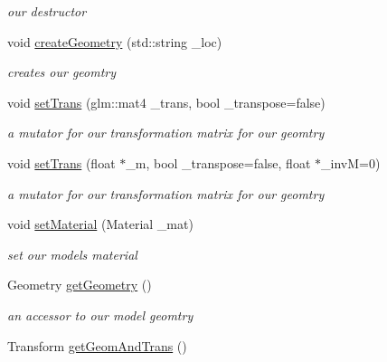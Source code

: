 \begin{DoxyCompactItemize}
\begin{DoxyCompactList}\small\item\em our destructor \end{DoxyCompactList}\item 
void \hyperlink{class_opti_x_model_ab98c422ba0ebd8f89ad702c827f2dacc}{create\-Geometry} (std\-::string \-\_\-loc)
\begin{DoxyCompactList}\small\item\em creates our geomtry \end{DoxyCompactList}\item 
void \hyperlink{class_opti_x_model_a901337f12a6b306703e29c7b57c4af86}{set\-Trans} (glm\-::mat4 \-\_\-trans, bool \-\_\-transpose=false)
\begin{DoxyCompactList}\small\item\em a mutator for our transformation matrix for our geomtry \end{DoxyCompactList}\item 
void \hyperlink{class_opti_x_model_ada3b7d6057e62aee8d88567c0806475c}{set\-Trans} (float $\ast$\-\_\-m, bool \-\_\-transpose=false, float $\ast$\-\_\-inv\-M=0)
\begin{DoxyCompactList}\small\item\em a mutator for our transformation matrix for our geomtry \end{DoxyCompactList}\item 
void \hyperlink{class_opti_x_model_aedaab5dc8da3cea6d1f6d8bc76d37903}{set\-Material} (Material \-\_\-mat)
\begin{DoxyCompactList}\small\item\em set our models material \end{DoxyCompactList}\item 
\hypertarget{class_opti_x_model_a47916c5dd22bbcc2d6bec581e76f7a54}{Geometry \hyperlink{class_opti_x_model_a47916c5dd22bbcc2d6bec581e76f7a54}{get\-Geometry} ()}\label{class_opti_x_model_a47916c5dd22bbcc2d6bec581e76f7a54}

\begin{DoxyCompactList}\small\item\em an accessor to our model geomtry \end{DoxyCompactList}\item 
\hypertarget{class_opti_x_model_a5b9b10ed9b5df1104a2bdb5019fcd06d}{Transform \hyperlink{class_opti_x_model_a5b9b10ed9b5df1104a2bdb5019fcd06d}{get\-Geom\-And\-Trans} ()}\label{class_opti_x_model_a5b9b10ed9b5df1104a2bdb5019fcd06d}


\end{DoxyCompactItemize}
